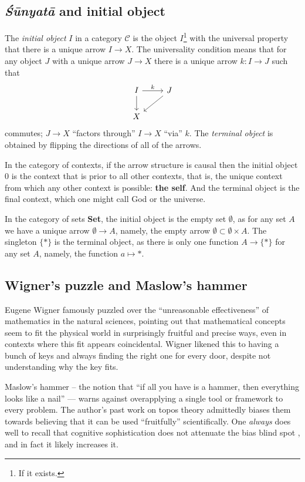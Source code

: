 \documentclass{article}
\begin{document}
\subsection{\emph{Śūnyatā} and initial object}
The \emph{initial object} $I$ in a category $\mathcal{C}$ is the object $I$\footnote{If it exists.} with the universal property that there is a unique arrow $I \to X$. The universality condition means that for any object $J$ with a unique arrow $J \to X$ there is a unique arrow $k \colon I \to J$ such that
\[
    \begin{tikzcd}
        I \arrow[r, "k"] \arrow[d] & J \arrow[ld] \\
        X
    \end{tikzcd}
\]
commutes; $J \to X$ ``factors through'' $I \to X$ ``via'' $k$. The \emph{terminal object} is obtained by flipping the directions of all of the arrows.

In the category of contexts, if the arrow structure is causal then the initial object $0$ is the context that is prior to all other contexts, that is, the unique context from which any other context is possible: \textbf{the self}. And the terminal object is the final context, which one might call God or the universe.

In the category of sets \textbf{Set}, the initial object is the empty set $\emptyset$, as for any set $A$ we have a unique arrow $\emptyset \to A$, namely, the empty arrow $\emptyset \subset \emptyset \times A$. The singleton $\{ * \}$ is the terminal object, as there is only one function $A \to \{ * \}$ for any set $A$, namely, the function $a \mapsto *$.

\subsection{Wigner's puzzle and Maslow's hammer}
Eugene Wigner famously puzzled over the ``unreasonable effectiveness'' of mathematics in the natural sciences, pointing out that mathematical concepts seem to fit the physical world in surprisingly fruitful and precise ways, even in contexts where this fit appears coincidental. Wigner likened this to having a bunch of keys and always finding the right one for every door, despite not understanding why the key fits.

Maslow's hammer -- the notion that ``if all you have is a hammer, then everything looks like a nail'' --- warns against overapplying a single tool or framework to every problem. The author's past work \cite{mahany2012} on topos theory admittedly biases them towards believing that it can be used ``fruitfully'' scientifically. One \emph{always} does well to recall that cognitive sophistication does not attenuate the bias blind spot \cite{west2012}, and in fact it likely increases it.
\end{document}
